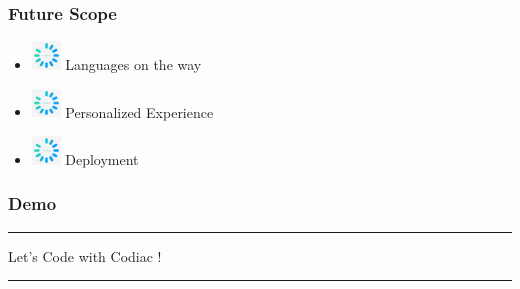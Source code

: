 \documentclass[14pt]{beamer}
\begin{document}
\begin{frame}
    \frametitle{Future Scope}
	\noindent                                                                                                       {\color{pink} \rule{\linewidth}{0.7mm}} 
         \begin{itemize}
 \item [] \includegraphics[width=0.3in, height=0.3in]{./logos/loading.jpg} Languages on the way\\
     \pause
 \item [] \includegraphics[width=0.3in, height=0.3in]{./logos/loading.jpg} Personalized Experience \\
     \pause
 \item [] \includegraphics[width=0.3in, height=0.3in]{./logos/loading.jpg} Deployment\\
 \end{itemize}
\noindent{	
	   \color{pink} \rule{\linewidth}{0.7mm} }   	
\end{frame}	


\begin{frame}
	\frametitle{Demo}
    {\color{dr} \rule{\linewidth}{0.7mm}}
    \linebreak
    \linebreak
    \centerline
    {\huge \color{dr}
    Let's Code with Codiac !}
    \linebreak

    {\color{dr} \rule{\linewidth}{0.7mm}}
\end{frame}
\end{document}
